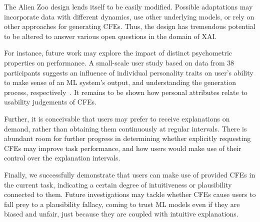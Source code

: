 The Alien Zoo design lends itself to be easily modified. 
Possible adaptations may incorporate data with different dynamics, use other underlying models, or rely on other approaches for generating \glspl{CFE}.
Thus, the design has tremendous potential to be altered to answer various open questions in the domain of \gls{XAI}.

For instance, future work may explore the impact of distinct psychometric properties on performance. 
A small-scale user study based on data from 38 participants suggests an influence of individual personality traits on user's ability to make sense of an \gls{ML} system's output, and understanding the generation process, respectively~\citep{gleaves_role_2020}.
It remains to be shown how personal attributes relate to usability judgements of \glspl{CFE}.

Further, it is conceivable that users may prefer to receive explanations on demand, rather than obtaining them continuously at regular intervals.
There is abundant room for further progress in determining whether explicitly requesting \glspl{CFE} may improve task performance, and how users would make use of their control over the explanation intervals.

Finally, we successfully demonstrate that users can make use of provided \glspl{CFE} in the current task, indicating a certain degree of intuitiveness or plausibility connected to them. 
Future investigations may tackle whether \glspl{CFE} cause users to fall prey to a plausibility fallacy, coming to trust ML models even if they are biased and unfair, just because they are coupled with intuitive explanations.

